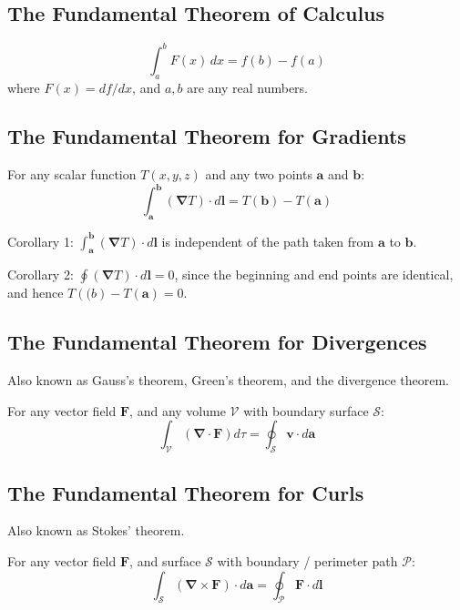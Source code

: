 \documentclass[a4paper]{article}
\theoremstyle{plain}
\theoremstyle{definition}
\newcommand{\vect}[1]{\textbf{#1}}
\newcommand{\del}{\bm{\nabla}}
\begin{document}
\subsection{The Fundamental Theorem of Calculus}

\begin{equation}
\int_{a}^{b} F(x) \,dx = f(b) - f(a)
\end{equation}
where $F(x) = df/dx$, and $a,b$ are any real numbers.

\subsection{The Fundamental Theorem for Gradients}

For any scalar function $T(x,y,z)$ and any two points $\vect{a}$ and
$\vect{b}$:
\begin{equation}
\int_{\vect{a}}^{\vect{b}} (\del T) \cdot d\vect{l} = T(\vect{b}) - T(\vect{a})
\end{equation}

Corollary 1: $\int_{\vect{a}}^{\vect{b}} (\del T) \cdot d\vect{l}$ is
independent of the path taken from $\vect{a}$ to $\vect{b}$.

Corollary 2: $\oint (\del T) \cdot d\vect{l} = 0$, since the beginning
and end points are identical, and hence $T(\vect(b) - T(\vect{a}) =
0$.

\subsection{The Fundamental Theorem for Divergences}

Also known as Gauss's theorem, Green's theorem, and the divergence
theorem.

For any vector field $\vect{F}$, and any volume $\mathcal{V}$ with
boundary surface $\mathcal{S}$:
\begin{equation}
\int_{\mathcal{V}} (\del \cdot \vect{F}) d\tau = \oint_{\mathcal{S}} \vect{v} \cdot d\vect{a}
\end{equation}

\subsection{The Fundamental Theorem for Curls}

Also known as Stokes' theorem.

For any vector field $\vect{F}$, and surface $\mathcal{S}$ with
boundary / perimeter path $\mathcal{P}$:
\begin{equation}
\int_{\mathcal{S}} (\del \times \vect{F}) \cdot d\vect{a} = \oint_{\mathcal{P}} \vect{F} \cdot d\vect{l}
\end{equation}
\end{document}

